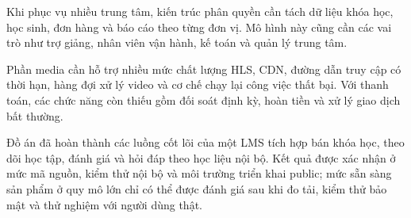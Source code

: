 \documentclass[../DoAn.tex]{subfiles}
\begin{document}
Khi phục vụ nhiều trung tâm, kiến trúc phân quyền cần tách dữ liệu khóa học, học sinh, đơn hàng và báo cáo theo từng đơn vị. Mô hình này cũng cần các vai trò như trợ giảng, nhân viên vận hành, kế toán và quản lý trung tâm.

Phần media cần hỗ trợ nhiều mức chất lượng HLS, CDN, đường dẫn truy cập có thời hạn, hàng đợi xử lý video và cơ chế chạy lại công việc thất bại. Với thanh toán, các chức năng còn thiếu gồm đối soát định kỳ, hoàn tiền và xử lý giao dịch bất thường.

Đồ án đã hoàn thành các luồng cốt lõi của một LMS tích hợp bán khóa học, theo dõi học tập, đánh giá và hỏi đáp theo học liệu nội bộ. Kết quả được xác nhận ở mức mã nguồn, kiểm thử nội bộ và môi trường triển khai public; mức sẵn sàng sản phẩm ở quy mô lớn chỉ có thể được đánh giá sau khi đo tải, kiểm thử bảo mật và thử nghiệm với người dùng thật.
\end{document}
